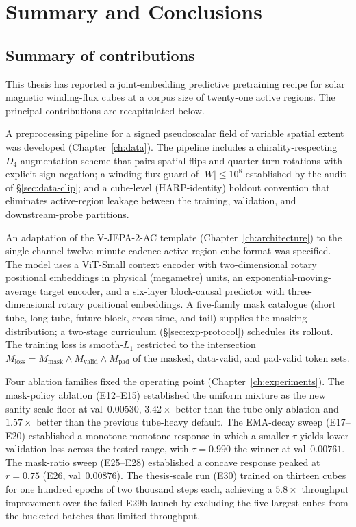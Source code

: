 \chapter{Summary and Conclusions}
\label{ch:summary}

\section{Summary of contributions}
\label{sec:sum-contrib}

This thesis has reported a joint-embedding predictive pretraining
recipe for solar magnetic winding-flux cubes at a corpus size of
twenty-one active regions. The principal contributions are
recapitulated below.

A preprocessing pipeline for a signed pseudoscalar field of
variable spatial extent was developed
(Chapter~\ref{ch:data}). The pipeline includes a
chirality-respecting $D_{4}$ augmentation scheme that pairs
spatial flips and quarter-turn rotations with explicit sign
negation; a winding-flux guard of $|W| \le 10^{8}$ established by
the audit of \S\ref{sec:data-clip}; and a cube-level (HARP-identity)
holdout convention that eliminates active-region leakage between
the training, validation, and downstream-probe partitions.

An adaptation of the V-JEPA-2-AC template
(Chapter~\ref{ch:architecture}) to the single-channel
twelve-minute-cadence active-region cube format was specified.
The model uses a ViT-Small context encoder with two-dimensional
rotary positional embeddings in physical (megametre) units, an
exponential-moving-average target encoder, and a six-layer
block-causal predictor with three-dimensional rotary positional
embeddings. A five-family mask catalogue (short tube, long tube,
future block, cross-time, and tail) supplies the masking
distribution; a two-stage curriculum (\S\ref{sec:exp-protocol})
schedules its rollout. The training loss is smooth-$L_{1}$
restricted to the intersection $M_{\text{loss}} = M_{\text{mask}}
\land M_{\text{valid}} \land M_{\text{pad}}$ of the masked,
data-valid, and pad-valid token sets.

Four ablation families fixed the operating point
(Chapter~\ref{ch:experiments}). The mask-policy ablation
(E12--E15) established the uniform mixture as the new sanity-scale
floor at val~$0.00530$, $3.42\times$ better than the tube-only
ablation and $1.57\times$ better than the previous tube-heavy
default. The EMA-decay sweep (E17--E20) established a monotone
monotone response in which a smaller $\tau$ yields lower
validation loss across the tested range, with
$\tau = 0.990$ the winner at val~$0.00761$. The mask-ratio sweep
(E25--E28) established a concave response peaked at $r = 0.75$
(E26, val~$0.00876$). The thesis-scale run (E30) trained on
thirteen cubes for one hundred epochs of two thousand steps each,
achieving a $5.8\times$ throughput improvement over the failed
E29b launch by excluding the five largest cubes from the bucketed
batches that limited throughput.

